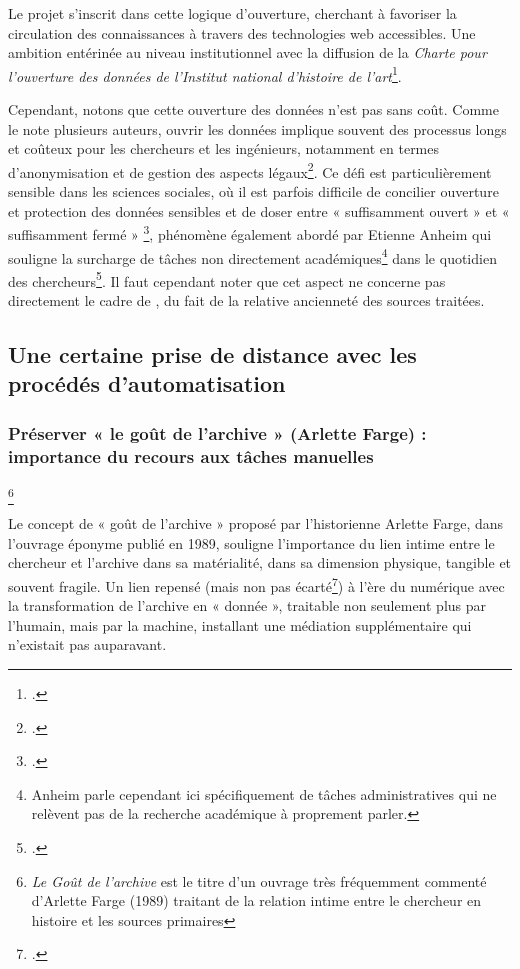 Le projet \pense s’inscrit dans cette logique d’ouverture, cherchant à favoriser la circulation des connaissances à travers des technologies web accessibles. Une ambition entérinée au niveau institutionnel avec la diffusion de la \textit{Charte pour l’ouverture des données de l’Institut national d’histoire de l’art}\footcite{nurra_pratique_2023}.

Cependant, notons que cette ouverture des données n’est pas sans coût. Comme le note plusieurs auteurs, ouvrir les données implique souvent des processus longs et coûteux pour les chercheurs et les ingénieurs, notamment en termes d’anonymisation et de gestion des aspects légaux\footcite[p.60]{aubry_artificial_2021}. Ce défi est particulièrement sensible dans les sciences sociales, où il est parfois difficile de concilier ouverture et protection des données sensibles et de doser entre « suffisamment ouvert » et « suffisamment fermé » \footcite{bendjaballah_sciences_2023}, phénomène également abordé par Etienne Anheim qui souligne la surcharge de tâches non directement académiques\footnote{Anheim parle cependant ici spécifiquement de tâches administratives qui ne relèvent pas de la recherche académique à proprement parler.} dans le quotidien des chercheurs\footcite{anheim_administrer_2018}. Il faut cependant noter que cet aspect ne concerne pas directement le cadre de \pense, du fait de la relative ancienneté des sources traitées.

\subsection{Une certaine prise de distance avec les procédés d’automatisation}

\subsubsection{Préserver « le goût de l’archive » (Arlette Farge) : importance du recours aux tâches manuelles}\footnote{\textit{Le Goût de l'archive} est le titre d’un ouvrage très fréquemment commenté d’Arlette Farge (1989) traitant de la relation intime entre le chercheur en histoire et les sources primaires}

Le concept de « goût de l’archive » proposé par l’historienne Arlette Farge, dans l’ouvrage éponyme publié en 1989, souligne l’importance du lien intime entre le chercheur et l’archive dans sa matérialité, dans sa dimension physique, tangible et souvent fragile. Un lien repensé (mais non pas écarté\footcite{clavert_gout_nodate}) à l’ère du numérique avec la transformation de l’archive en « donnée », traitable non seulement plus par l’humain, mais par la machine, installant une médiation supplémentaire qui n’existait pas auparavant.
\newline
{}\\

